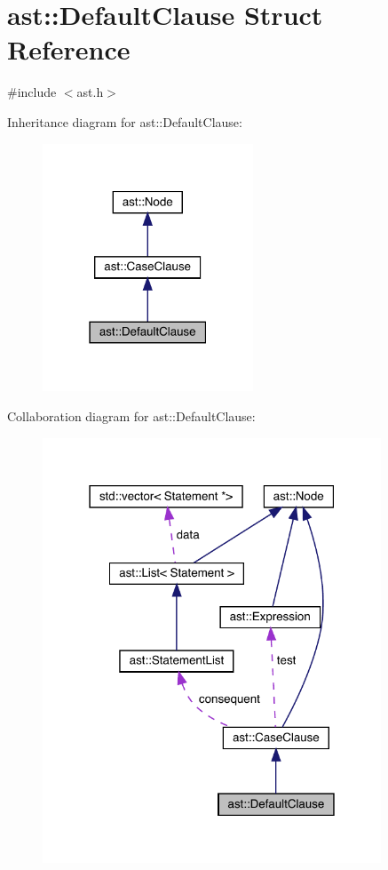 \hypertarget{structast_1_1_default_clause}{}\section{ast\+:\+:Default\+Clause Struct Reference}
\label{structast_1_1_default_clause}


{\ttfamily \#include $<$ast.\+h$>$}



Inheritance diagram for ast\+:\+:Default\+Clause\+:
\nopagebreak
\begin{figure}[H]
\begin{center}
\leavevmode
\includegraphics[width=178pt]{structast_1_1_default_clause__inherit__graph}
\end{center}
\end{figure}


Collaboration diagram for ast\+:\+:Default\+Clause\+:
\nopagebreak
\begin{figure}[H]
\begin{center}
\leavevmode
\includegraphics[width=286pt]{structast_1_1_default_clause__coll__graph}
\end{center}
\end{figure}

